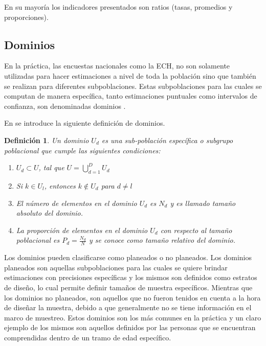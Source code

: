 \documentclass[12pt,twoside,spanish,a4paper]{book}\usepackage[]{graphicx}\usepackage[]{color}
\begin{document}
En su mayoría los indicadores presentados son ratios (tasas, promedios y proporciones).

\subsection{Dominios \label{subsec:dom}}

En la práctica, las encuestas nacionales como la ECH, no son solamente utilizadas para hacer estimaciones a nivel de toda la población sino que también se realizan para diferentes subpoblaciones. Estas subpoblaciones para las cuales se computan de manera específica, tanto estimaciones puntuales como intervalos de confianza, son denominadas dominios \citep{sarndal2003model}.

En \citep{rojas2016estrategias} se introduce la siguiente definición de dominios.

\newtheorem{defi}{Definición}[chapter]

\begin{defi}
Un dominio $U_d$ es una sub-población específica o subgrupo poblacional que cumple las siguientes condiciones: 
\begin{enumerate}
\item $U_d \subset U$, tal que $U=\bigcup_{d=1}^{D}U_d$
\item Si $k \in  U_l$, entonces $k \notin  U_d$ para $d \neq l$
\item El número de elementos en el dominio $U_d$ es $N_d$ y es llamado tamaño absoluto del dominio.
\item La proporción de elementos en el dominio $U_d$ con respecto al tamaño poblacional es $P_d =\frac{N_d}{N}$ y se conoce como tamaño relativo del dominio.

\end{enumerate}
\end{defi}

Los dominios pueden clasificarse como planeados o no planeados. Los dominios planeados son aquellas subpoblaciones para las cuales se quiere brindar estimaciones con precisiones específicas y los mismos son definidos como estratos de diseño, lo cual permite definir tamaños de muestra específicos. Mientras que los dominios no planeados, son aquellos que no fueron tenidos en cuenta a la hora de diseñar la muestra, debido a que generalmente no se tiene información en el marco de muestreo. Estos dominios son los más comunes en la práctica y un claro ejemplo de los mismos son aquellos definidos por las personas que se encuentran comprendidas dentro de un tramo de edad específico.
\end{document}
